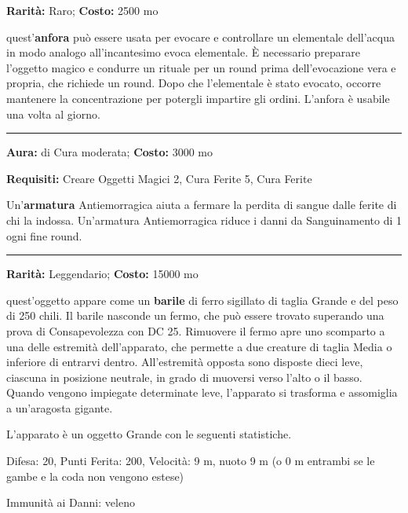 \begin{multicols}{2}
\textbf{Rarità:} Raro; \textbf{Costo:} 2500 mo

quest'\textbf{anfora} può essere usata per evocare e controllare un elementale dell'acqua in modo analogo all'incantesimo evoca elementale. È necessario preparare l'oggetto magico e condurre un rituale per un round prima dell'evocazione vera e propria, che richiede un round. Dopo che l'elementale è stato evocato, occorre mantenere la concentrazione per potergli impartire gli ordini. L'anfora è usabile una volta al giorno.

\smallskip\noindent\rule{\linewidth}{2pt}  \hypertarget{Antiemorragica}{}\medskip{}\noindent\label{Antiemorragica}

\textbf{Aura:} di Cura moderata; \textbf{Costo:} 3000 mo

\textbf{Requisiti:} Creare Oggetti Magici 2, Cura Ferite 5, Cura Ferite

Un'\textbf{armatura} Antiemorragica aiuta a fermare la perdita di sangue dalle ferite di chi la indossa. Un'armatura Antiemorragica riduce i danni da Sanguinamento di 1 ogni fine round.

\smallskip\noindent\rule{\linewidth}{2pt}  \hypertarget{ApparatodelGranchio}{}\medskip{}\noindent\label{ApparatodelGranchio}

\textbf{Rarità:} Leggendario; \textbf{Costo:} 15000 mo

quest'oggetto appare come un \textbf{barile} di ferro sigillato di taglia Grande e del peso di 250 chili. Il barile nasconde un fermo, che può essere trovato superando una prova di Consapevolezza con DC 25. Rimuovere il fermo apre uno scomparto a una delle estremità dell'apparato, che permette a due creature di taglia Media o inferiore di entrarvi dentro. All'estremità opposta sono disposte dieci leve, ciascuna in posizione neutrale, in grado di muoversi verso l'alto o il basso. Quando vengono impiegate determinate leve, l'apparato si trasforma e assomiglia a un'aragosta gigante.

L'apparato è un oggetto Grande con le seguenti statistiche.

Difesa: 20, Punti Ferita: 200, Velocità: 9 m, nuoto 9 m (o 0 m entrambi se le gambe e la coda non vengono estese)

Immunità ai Danni: veleno


\end{multicols}
